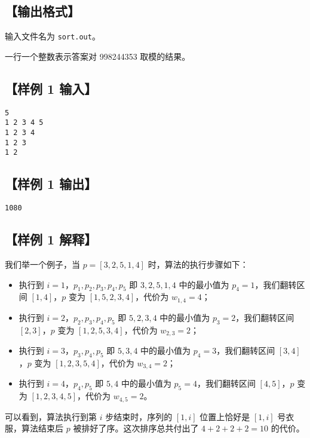 \documentclass[11pt,a4paper,oneside]{article}
\begin{document}
\subsection*{【输出格式】}

输入文件名为 \texttt{sort.out}。

一行一个整数表示答案对 998244353 取模的结果。

\subsection*{【样例 1 输入】}

\begin{verbatim}
5
1 2 3 4 5
1 2 3 4
1 2 3
1 2
\end{verbatim}

\subsection*{【样例 1 输出】}

\begin{verbatim}
1080
\end{verbatim}

\subsection*{【样例 1 解释】}

我们举一个例子，当 $p=[3,2,5,1,4]$ 时，算法的执行步骤如下：

\begin{itemize}
  \item 执行到 $i=1$，$p_1,p_2,p_3,p_4,p_5$ 即 $3,2,5,1,4$ 中的最小值为 $p_4=1$，我们翻转区间 $[1,4]$，$p$ 变为 $[1,5,2,3,4]$，代价为 $w_{1,4}=4$；
  \item 执行到 $i=2$，$p_2,p_3,p_4,p_5$ 即 $5,2,3,4$ 中的最小值为 $p_3=2$，我们翻转区间 $[2,3]$，$p$ 变为 $[1,2,5,3,4]$，代价为 $w_{2,3}=2$；
  \item 执行到 $i=3$，$p_3,p_4,p_5$ 即 $5,3,4$ 中的最小值为 $p_4=3$，我们翻转区间 $[3,4]$，$p$ 变为 $[1,2,3,5,4]$，代价为 $w_{3,4}=2$；
  \item 执行到 $i=4$，$p_4,p_5$ 即 $5,4$ 中的最小值为 $p_5=4$，我们翻转区间 $[4,5]$，$p$ 变为 $[1,2,3,4,5]$，代价为 $w_{4,5}=2$。
\end{itemize}

可以看到，算法执行到第 $i$ 步结束时，序列的 $[1,i]$ 位置上恰好是 $[1,i]$ 号衣服，算法结束后 $p$ 被排好了序。这次排序总共付出了 $4+2+2+2=10$ 的代价。
\end{document}
